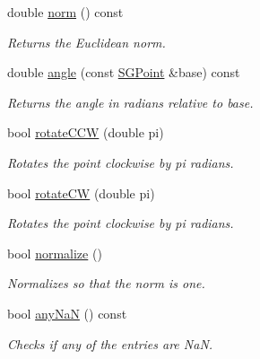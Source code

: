 \begin{DoxyCompactItemize}
double \hyperlink{classSGPoint_ae8864088ce6a0665f0697423c0ea76f3}{norm} () const
\begin{DoxyCompactList}\small\item\em Returns the Euclidean norm. \end{DoxyCompactList}\item 
\mbox{\label{classSGPoint_afee4ccc1595350274c32a60fc1862b2c}} 
double \hyperlink{classSGPoint_afee4ccc1595350274c32a60fc1862b2c}{angle} (const \hyperlink{classSGPoint}{S\+G\+Point} \&base) const
\begin{DoxyCompactList}\small\item\em Returns the angle in radians relative to base. \end{DoxyCompactList}\item 
\mbox{\label{classSGPoint_a610ade44cb6dbedf61d1465f9d8a33ae}} 
bool \hyperlink{classSGPoint_a610ade44cb6dbedf61d1465f9d8a33ae}{rotate\+C\+CW} (double pi)
\begin{DoxyCompactList}\small\item\em Rotates the point clockwise by pi radians. \end{DoxyCompactList}\item 
\mbox{\label{classSGPoint_a2a48c83f8d1bf739e0c02f112f41b7b5}} 
bool \hyperlink{classSGPoint_a2a48c83f8d1bf739e0c02f112f41b7b5}{rotate\+CW} (double pi)
\begin{DoxyCompactList}\small\item\em Rotates the point clockwise by pi radians. \end{DoxyCompactList}\item 
\mbox{\label{classSGPoint_a9cffe2063889966a860a6d11fd123eb7}} 
bool \hyperlink{classSGPoint_a9cffe2063889966a860a6d11fd123eb7}{normalize} ()
\begin{DoxyCompactList}\small\item\em Normalizes so that the norm is one. \end{DoxyCompactList}\item 
\mbox{\label{classSGPoint_a11ecb343379efcef9ed3c2f9bb8cb8e6}} 
bool \hyperlink{classSGPoint_a11ecb343379efcef9ed3c2f9bb8cb8e6}{any\+NaN} () const
\begin{DoxyCompactList}\small\item\em Checks if any of the entries are NaN. \end{DoxyCompactList}\item 

\end{DoxyCompactItemize}
